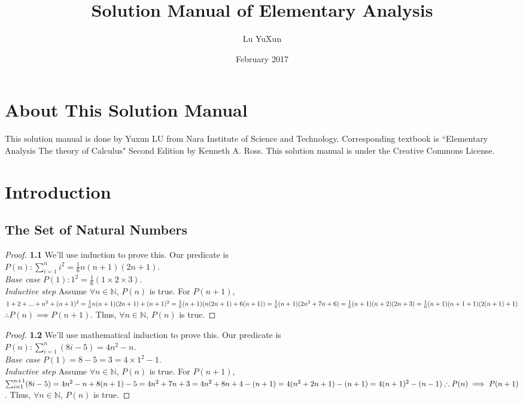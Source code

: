 \documentclass{article}
\title{Solution Manual of Elementary Analysis}
\author{Lu YuXun}
\date{February 2017}
\begin{document}
\maketitle
\section*{About This Solution Manual}
This solution manual is done by Yuxun LU from Nara Institute of Science and Technology. Corresponding textbook is ``Elementary Analysis The theory of Calculus" Second Edition by Kenneth A. Ross. This solution manual is under the Creative Commons License.
\section{Introduction}
\subsection{The Set of Natural Numbers}
\begin{proof}
\textbf{1.1}
We'll use induction to prove this. Our predicate is 
\\ $P(n): \sum_{i=1}^n i^2 = \frac{1}{6}n(n+1)(2n+1)$.
\\ \textit{Base case} $P(1): 1^2 = \frac{1}{6}(1 \times 2 \times 3)$.
\\ \textit{Inductive step} Assume $\forall n \in \mathbb{N}$, $P(n)$ is true. For $P(n+1)$,
\\ $1 + 2 + ... + n^2 + (n+1)^2
\\ = \frac{1}{6}n(n+1)(2n+1) + (n+1)^2
\\ = \frac{1}{6}(n+1)( n(2n+1) + 6(n+1) )
\\ = \frac{1}{6}(n+1)(2n^2 + 7n + 6) 
\\ = \frac{1}{6}(n+1)(n+2)(2n+3) 
\\ = \frac{1}{6}(n+1)(n+1+1)(2(n+1)+1)$
\\ $\therefore P(n) \implies P(n+1)$. Thus, $\forall n \in \mathbb{N}$, $P(n)$ is true.
\end{proof}
\begin{proof}
\textbf{1.2} We'll use mathematical induction to prove this. Our predicate is
\\ $P(n): \sum_{i=1}^n (8i-5) = 4n^2 - n$.
\\ \textit{Base case} $P(1) = 8 - 5 = 3 = 4 \times 1^2 - 1$.
\\ \textit{Inductive step} Assume $\forall n \in \mathbb{N}$, $P(n)$ is true. For $P(n+1)$,
\\ $\sum_{i=1}^{n+1} (8i-5)
\\ = 4n^2-n + 8(n+1) - 5 
\\ = 4n^2 + 7n + 3
\\ = 4n^2 + 8n + 4 - (n+1)
\\ = 4(n^2+2n+1) - (n+1)
\\ = 4(n+1)^2 - (n-1)
\\ \therefore P(n) \implies P(n+1)$. Thus, $\forall n \in \mathbb{N}$, $P(n)$ is true.
\end{proof}
\end{document}
